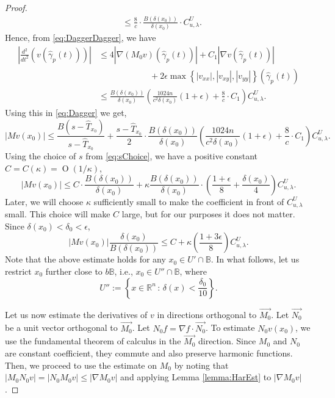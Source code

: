 \documentclass[12pt,a4paper]{amsart}
\numberwithin{equation}{section}
\theoremstyle{definition}
\begin{document}
\begin{proof}
\begin{align*}
&\le \frac{8}{c}\cdot\frac{B(\delta(x_0))}{\delta(x_0)}\cdot C_{u,\lambda}^U.
\end{align*}
Hence, from \eqref{eq:DaggerDagger}, we have
\begin{align*}
{\left\lvert{\frac{d^2}{dt^2}\left(v\left(\widehat{\gamma}_p(t)\right)\right)}\right\rvert} &\le 4{\left\lvert{\nabla(M_0 v)(\widehat{\gamma}_p(t))}\right\rvert} + C_1{\left\lvert{\nabla v (\widehat{\gamma}_p(t))}\right\rvert} \\
 &\hspace{1in} + 2\epsilon\max\left\{{\left\lvert{v_{xx}}\right\rvert}, {\left\lvert{v_{xy}}\right\rvert}, {\left\lvert{v_{yy}}\right\rvert}\right\}(\widehat{\gamma}_p(t))\\
 &\le \frac{B(\delta(x_0))}{\delta(x_0)}\left(\frac{1024n}{c^2\delta(x_0)}(1+\epsilon)+\frac{8}{c}\cdot C_1\right)C_{u,\lambda}^U.
\end{align*}
Using this in \eqref{eq:Dagger} we get,
\[{\left\lvert{Mv(x_0)}\right\rvert} \le \frac{B(s-\widehat{T}_{x_0})}{s-\widehat{T}_{x_0}} + \frac{s-\widehat{T}_{x_0}}{2}\cdot\frac{B(\delta(x_0))}{\delta(x_0)}\left(\frac{1024n}{c^2\delta(x_0)}(1+\epsilon)+\frac{8}{c}\cdot C_1\right)C_{u,\lambda}^U.\]
Using the choice of $s$ from \eqref{eq:sChoice}, we have a positive constant $C=C(\kappa) = \operatorname{O}(1/\kappa)$,
\[{\left\lvert{Mv(x_0)}\right\rvert} \le C\cdot\frac{B(\delta(x_0))}{\delta(x_0)} + \kappa\frac{B(\delta(x_0))}{\delta(x_0)}\cdot\left(\frac{1+\epsilon}{8}+\frac{\delta(x_0)}{4}\right)C_{u,\lambda}^U.\]
Later, we will choose $\kappa$ sufficiently small to make the coefficient in front of $C_{u,\lambda}^U$ small. This choice will make $C$ large, but for our purposes it does not matter. Since $\delta(x_0) < \delta_0 < \epsilon$,
\begin{equation}\label{eq:MEst}
{\left\lvert{Mv(x_0)}\right\rvert}\frac{\delta(x_0)}{B(\delta(x_0))} \le C + \kappa\left(\frac{1+3\epsilon}{8}\right) C_{u,\lambda}^U.
\end{equation}
Note that the above estimate holds for any $x_0\in U'\cap\mathbb{B}$. In what follows, let us restrict $x_0$ further close to $b\mathbb{B}$, i.e., $x_0\in U''\cap\mathbb{B}$, where 
\[U'' := \left\{ x\in\mathbb{R}^n \, :\, \delta(x) < \frac{\delta_0}{10}\right\}.\]

Let us now estimate the derivatives of $v$ in directions orthogonal to $\vec{M_0}$. Let $\vec{N_0}$ be a unit vector orthogonal to $\vec{M_0}$. Let $N_0f = \nabla f \cdot \vec{N_0}$. To estimate $N_0v(x_0)$, 
we use the fundamental theorem of calculus in the $\vec{M_0}$ direction. Since $M_0$ and $N_0$ are constant coefficient, they commute and also preserve harmonic functions. Then, we proceed to use the 
estimate on $M_0$ by noting that ${\left\lvert{M_0N_0 v}\right\rvert} = {\left\lvert{N_0M_0 v}\right\rvert} \le {\left\lvert{\nabla M_0 v}\right\rvert}$ and applying Lemma \ref{lemma:HarEst} to ${\left\lvert{\nabla M_0 v}\right\rvert}$.
 

\end{proof}
\end{document}
